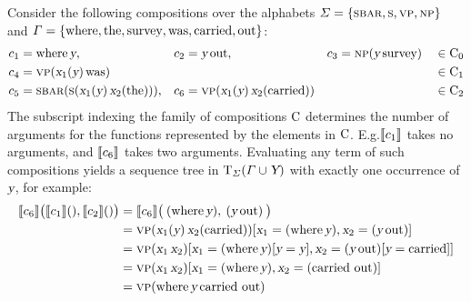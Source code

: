 \documentclass[../document.tex]{subfiles}
\begin{document}

    \begin{example}\label{ex:dcp:comp}
        Consider the following compositions over the alphabets \(\varSigma = \{ \textsc{sbar}, \textsc{s}, \textsc{vp}, \textsc{np} \}\) and \(\varGamma = \{\text{where}, \text{the}, \text{survey}, \text{was}, \text{carried}, \text{out}\}\):
        \begin{align*}
             c_1 &= \text{where} \, \textsl{y},
            &c_2 &= \textsl{y} \, \text{out},
            &c_3 &= \textsc{np} (\textsl{y} \, \text{survey}) && \in \mathrm{C}_0\\
             c_4 &= \textsc{vp}(\textsl{x}_1(\textsl{y}) \, \text{was}) && && && \in \mathrm{C}_1 \\
             c_5 &= \textsc{sbar} (\textsc{s} (\textsl{x}_1(\textsl{y}) \, \textsl{x}_2(\text{the}))),
            &c_6 &= \textsc{vp}(\textsl{x}_1(\textsl{y}) \, \textsl{x}_2(\text{carried})) && && \in \mathrm{C}_2
        \end{align*}
        The subscript indexing the family of compositions \(\mathrm{C}\) determines the number of arguments for the functions represented by the elements in \(\mathrm{C}\).
        E.g.\@ \(\llbracket c_1\rrbracket\) takes no arguments, and \(\llbracket c_6\rrbracket\) takes two arguments.
        Evaluating any term of such compositions yields a sequence tree in \(\operatorname{T}_\varSigma(\varGamma \cup \textsl{Y})\) with exactly one occurrence of \(\textsl{y}\), for example:
        \begin{align*}
            \llbracket c_6\rrbracket \big( \llbracket c_1\rrbracket(), \llbracket c_2\rrbracket() \big)
                &= \llbracket c_6\rrbracket \big( \: (\text{where} \, \textsl{y}), \: (\textsl{y} \, \text{out}) \: \big) \\
                &= \textsc{vp}(\textsl{x}_1(\textsl{y}) \, \textsl{x}_2(\text{carried}))[\textsl{x}_1=(\text{where} \, \textsl{y}), \textsl{x}_2=(\textsl{y} \, \text{out})] \\
                &= \textsc{vp}(\textsl{x}_1 \, \textsl{x}_2)[\textsl{x}_1=(\text{where} \, \textsl{y})[\textsl{y}=\textsl{y}], \textsl{x}_2=(\textsl{y} \, \text{out})[\textsl{y}=\text{carried}]] \\
                &= \textsc{vp}(\textsl{x}_1 \, \textsl{x}_2)[\textsl{x}_1=(\text{where} \, \textsl{y}), \textsl{x}_2=(\text{carried out})] \\
                &= \textsc{vp}(\text{where} \, \textsl{y} \, \text{carried out})
        \end{align*}
    \end{example}
\end{document}
